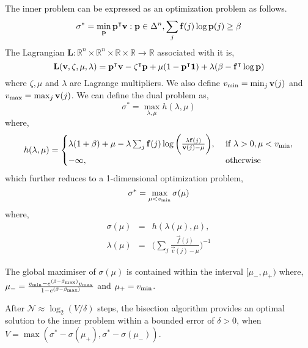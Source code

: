 The inner problem can be expressed as an optimization problem as follows.
\begin{equation}
\sigma^* = \min_{\mathbf{p}} \mathbf{\mathbf{p}}^\intercal\mathbf{v}: \mathbf{p} \in \Delta^n, \sum_{j} \mathbf{f}(j)\log{\ensuremath{\mathbf{p}}(j)} \geq \beta
\end{equation}
The Lagrangian $\mathbf{L}: \mathbb{R}^n \times \mathbb{R}^n \times \mathbb{R} \times \mathbb{R} \rightarrow \mathbb{R}$ associated with it is,
\begin{equation}
\mathbf{L}(\mathbf{v}, \zeta, \mu, \lambda) = \mathbf{\mathbf{p}}^\intercal\mathbf{v} - \mathbf{\zeta}^\intercal\mathbf{p} + \mu(1 - \mathbf{\mathbf{p}}^\intercal\mathbf{1}) + \lambda(\beta - \mathbf{f}^\intercal\log{\ensuremath{\mathbf{p}}})
\end{equation}
where $\zeta, \mu$ and $\lambda$ are Lagrange multipliers. We also define $v_{\textrm{min}} = \min_j{\mathbf{v}(j)}$ and $v_{\textrm{max}} = \max_j{\mathbf{v}(j)}$. We can define the dual problem as,
\begin{equation}
\sigma^* = \max_{\lambda, \mu} h(\lambda, \mu)
\end{equation}
where,
\begin{eqnarray}
h(\lambda, \mu) = 
	\begin{cases}
	\lambda(1 + \beta) + \mu - \lambda \sum_j \mathbf{f}(j) \log\bigg({\frac{\lambda \mathbf{f}(j)}{\mathbf{v}(j) - \mu}}\bigg), &\textrm{  if } \lambda > 0, \mu < v_{\textrm{min}}, \\
	-\infty, &\textrm{  otherwise } \\
	\end{cases} \nonumber
\end{eqnarray}
which further reduces to a 1-dimensional optimization problem,
\begin{equation}
\sigma^* = \max_{\mu < v_{\textrm{min}}} \sigma(\mu)
\end{equation}
where,
\begin{eqnarray*}
\sigma(\mu) &=& h(\lambda(\mu), \mu), \\
\lambda(\mu) &=& \bigg(\sum_{j} \frac{\vec{f}(j)}{\vec{v}(j) - \mu}\bigg)^{-1}
\end{eqnarray*}
\begin{lemma}
The global maximiser of $\sigma(\mu)$ is contained within the interval $[\mu_{-}, \mu_{+})$ where, $\mu_{-} = \frac{v_{\textrm{min}} - e^{(\beta - \beta_{\textrm{max}})}v_{\textrm{max}}}{1 - e^{(\beta - \beta_{\textrm{max}})}}$ and $\mu_{+} = v_{\textrm{min}}$.
\end{lemma}
\begin{lemma}
After $\mathcal{N} \approx \log_2(V/ \delta)$ steps, the bisection algorithm provides an optimal solution to the inner problem within a bounded error of $\delta > 0$, when
$V = \max(\sigma^* - \sigma(\mu_+), \sigma^* - \sigma(\mu_-))$.
\end{lemma}
